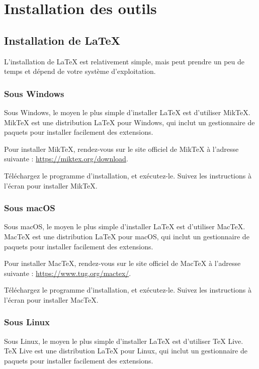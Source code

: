 \documentclass[./main.tex]{subfiles}
\begin{document}
\chapter{Installation des outils}

\section{Installation de \LaTeX{}}

L'installation de \LaTeX{} est relativement simple, mais peut prendre un peu de temps et dépend de votre système d'exploitation.

\subsection{Sous Windows}

Sous Windows, le moyen le plus simple d'installer \LaTeX{} est d'utiliser Mik\TeX{}. Mik\TeX{} est une distribution \LaTeX{} pour Windows, qui inclut un gestionnaire de paquets pour installer facilement des extensions.

Pour installer Mik\TeX{}, rendez-vous sur le site officiel de Mik\TeX{} à l'adresse suivante : \url{https://miktex.org/download}.

Téléchargez le programme d'installation, et exécutez-le. Suivez les instructions à l'écran pour installer Mik\TeX{}.

\subsection{Sous macOS}

Sous macOS, le moyen le plus simple d'installer \LaTeX{} est d'utiliser Mac\TeX{}. Mac\TeX{} est une distribution \LaTeX{} pour macOS, qui inclut un gestionnaire de paquets pour installer facilement des extensions.

Pour installer Mac\TeX{}, rendez-vous sur le site officiel de Mac\TeX{} à l'adresse suivante : \url{https://www.tug.org/mactex/}.

Téléchargez le programme d'installation, et exécutez-le. Suivez les instructions à l'écran pour installer Mac\TeX{}.

\subsection{Sous Linux}

Sous Linux, le moyen le plus simple d'installer \LaTeX{} est d'utiliser TeX Live. TeX Live est une distribution \LaTeX{} pour Linux, qui inclut un gestionnaire de paquets pour installer facilement des extensions.
\end{document}
